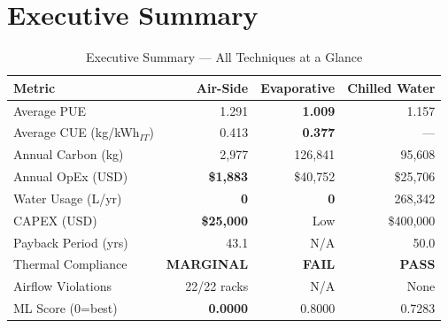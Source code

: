 ﻿\documentclass[12pt,a4paper]{report}
\newcommand{\pass}{\textcolor{passgreen}{\textbf{PASS}}}
\newcommand{\fail}{\textcolor{failred}{\textbf{FAIL}}}
\newcommand{\marginal}{\textcolor{warnorng}{\textbf{MARGINAL}}}
\begin{document}
\section{Executive Summary}
\label{sec:exec}

\begin{table}[H]
\centering
\caption{Executive Summary --- All Techniques at a Glance}
\label{tab:exec_summary}
\renewcommand{\arraystretch}{1.5}
\begin{tabular}{lrrr}
\toprule
\textbf{Metric} & \textbf{Air-Side} & \textbf{Evaporative} & \textbf{Chilled Water} \\
\midrule
Average PUE & 1.291 & \textbf{1.009} & 1.157 \\
Average CUE (kg/kWh$_{IT}$) & 0.413 & \textbf{0.377} & --- \\
Annual Carbon (kg) & 2{,}977 & 126{,}841 & 95{,}608 \\
Annual OpEx (USD) & \textbf{\$1{,}883} & \$40{,}752 & \$25{,}706 \\
Water Usage (L/yr) & \textbf{0} & \textbf{0} & 268{,}342 \\
CAPEX (USD) & \textbf{\$25{,}000} & Low & \$400{,}000 \\
Payback Period (yrs) & 43.1 & N/A & 50.0 \\
Thermal Compliance & \marginal & \fail & \textbf{\pass} \\
Airflow Violations & 22/22 racks & N/A & None \\
ML Score (0=best) & \textbf{0.0000} & 0.8000 & 0.7283 \\
\bottomrule
\end{tabular}
\end{table}
\end{document}

